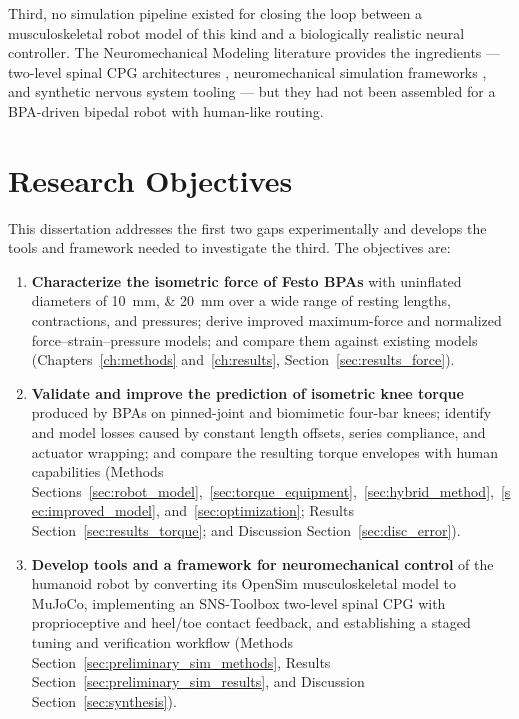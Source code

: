Third, no simulation pipeline existed for closing the loop between a musculoskeletal robot model of this kind and a biologically realistic neural controller. The Neuromechanical Modeling literature provides the ingredients --- two-level spinal CPG architectures \citep{rybak_modelling_2006, mccrea_organization_2008}, neuromechanical simulation frameworks \citep{markin_afferent_2010}, and synthetic nervous system tooling \citep{nourse_sns_2023} --- but they had not been assembled for a BPA-driven bipedal robot with human-like routing.

\section{Research Objectives}\label{sec:objectives}

This dissertation addresses the first two gaps experimentally and develops the tools and framework needed to investigate the third. The objectives are:

\begin{enumerate}
    \item \textbf{Characterize the isometric force of Festo BPAs} with uninflated diameters of \qtylist{10;20}{\mm} over a wide range of resting lengths, contractions, and pressures; derive improved maximum-force and normalized force--strain--pressure models; and compare them against existing models (Chapters~\ref{ch:methods} and~\ref{ch:results}, Section~\ref{sec:results_force}).
    \item \textbf{Validate and improve the prediction of isometric knee torque} produced by BPAs on pinned-joint and biomimetic four-bar knees; identify and model losses caused by constant length offsets, series compliance, and actuator wrapping; and compare the resulting torque envelopes with human capabilities (Methods Sections~\ref{sec:robot_model},~\ref{sec:torque_equipment},~\ref{sec:hybrid_method},~\ref{sec:improved_model}, and~\ref{sec:optimization}; Results Section~\ref{sec:results_torque}; and Discussion Section~\ref{sec:disc_error}).
    \item \textbf{Develop tools and a framework for neuromechanical control} of the humanoid robot by converting its OpenSim musculoskeletal model to MuJoCo, implementing an SNS-Toolbox two-level spinal CPG with proprioceptive and heel/toe contact feedback, and establishing a staged tuning and verification workflow (Methods Section~\ref{sec:preliminary_sim_methods}, Results Section~\ref{sec:preliminary_sim_results}, and Discussion Section~\ref{sec:synthesis}).
\end{enumerate}

